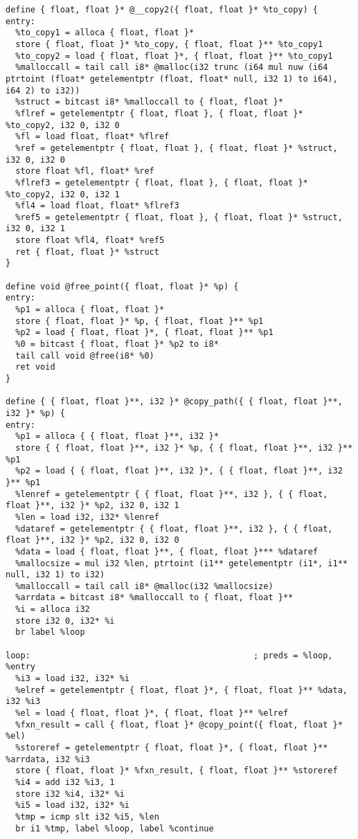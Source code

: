 \documentclass[main.tex]{subfiles}
\begin{document}
{\begin{lstlisting}
define { float, float }* @__copy2({ float, float }* %to_copy) {
entry:
  %to_copy1 = alloca { float, float }*
  store { float, float }* %to_copy, { float, float }** %to_copy1
  %to_copy2 = load { float, float }*, { float, float }** %to_copy1
  %malloccall = tail call i8* @malloc(i32 trunc (i64 mul nuw (i64 ptrtoint (float* getelementptr (float, float* null, i32 1) to i64), i64 2) to i32))
  %struct = bitcast i8* %malloccall to { float, float }*
  %flref = getelementptr { float, float }, { float, float }* %to_copy2, i32 0, i32 0
  %fl = load float, float* %flref
  %ref = getelementptr { float, float }, { float, float }* %struct, i32 0, i32 0
  store float %fl, float* %ref
  %flref3 = getelementptr { float, float }, { float, float }* %to_copy2, i32 0, i32 1
  %fl4 = load float, float* %flref3
  %ref5 = getelementptr { float, float }, { float, float }* %struct, i32 0, i32 1
  store float %fl4, float* %ref5
  ret { float, float }* %struct
}

define void @free_point({ float, float }* %p) {
entry:
  %p1 = alloca { float, float }*
  store { float, float }* %p, { float, float }** %p1
  %p2 = load { float, float }*, { float, float }** %p1
  %0 = bitcast { float, float }* %p2 to i8*
  tail call void @free(i8* %0)
  ret void
}

define { { float, float }**, i32 }* @copy_path({ { float, float }**, i32 }* %p) {
entry:
  %p1 = alloca { { float, float }**, i32 }*
  store { { float, float }**, i32 }* %p, { { float, float }**, i32 }** %p1
  %p2 = load { { float, float }**, i32 }*, { { float, float }**, i32 }** %p1
  %lenref = getelementptr { { float, float }**, i32 }, { { float, float }**, i32 }* %p2, i32 0, i32 1
  %len = load i32, i32* %lenref
  %dataref = getelementptr { { float, float }**, i32 }, { { float, float }**, i32 }* %p2, i32 0, i32 0
  %data = load { float, float }**, { float, float }*** %dataref
  %mallocsize = mul i32 %len, ptrtoint (i1** getelementptr (i1*, i1** null, i32 1) to i32)
  %malloccall = tail call i8* @malloc(i32 %mallocsize)
  %arrdata = bitcast i8* %malloccall to { float, float }**
  %i = alloca i32
  store i32 0, i32* %i
  br label %loop

loop:                                             ; preds = %loop, %entry
  %i3 = load i32, i32* %i
  %elref = getelementptr { float, float }*, { float, float }** %data, i32 %i3
  %el = load { float, float }*, { float, float }** %elref
  %fxn_result = call { float, float }* @copy_point({ float, float }* %el)
  %storeref = getelementptr { float, float }*, { float, float }** %arrdata, i32 %i3
  store { float, float }* %fxn_result, { float, float }** %storeref
  %i4 = add i32 %i3, 1
  store i32 %i4, i32* %i
  %i5 = load i32, i32* %i
  %tmp = icmp slt i32 %i5, %len
  br i1 %tmp, label %loop, label %continue


\end{lstlisting}}
\end{document}
